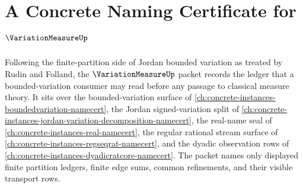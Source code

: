 \chapter{A Concrete Naming Certificate for $\VariationMeasureUp$}
\label{ch:concrete-instances-variation-measure-namecert}

Following the finite-partition side of Jordan bounded variation as treated by Rudin and Folland, the $\VariationMeasureUp$ packet records the ledger that a bounded-variation consumer may read before any passage to classical measure theory. It sits over the bounded-variation surface of \autoref{ch:concrete-instances-boundedvariation-namecert}, the Jordan signed-variation split of \autoref{ch:concrete-instances-jordan-variation-decomposition-namecert}, the real-name seal of \autoref{ch:concrete-instances-real-namecert}, the regular rational stream surface of \autoref{ch:concrete-instances-regseqrat-namecert}, and the dyadic observation rows of \autoref{ch:concrete-instances-dyadicratcore-namecert}. The packet names only displayed finite partition ledgers, finite edge sums, common refinements, and their visible transport rows.

